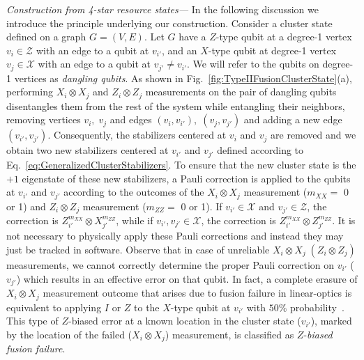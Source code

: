 \documentclass[reprint,
groupedaddress,
 prl,amsmath,amssymb,
 aps]{revtex4-2}
\theoremstyle{definition}
\begin{document}
\begin{bibunit}
{\it Construction from 4-star resource states---} In the following discussion we introduce the principle underlying our construction. Consider a cluster state defined on a graph $G=(V,E)$. Let $G$ have a $Z$-type qubit at a degree-1 vertex $v_i\in\mathcal{Z}$ with an edge to a qubit at $v_{i'}$, and an $X$-type qubit at degree-1 vertex $v_j\in\mathcal{X}$ with an edge to a qubit at $v_{j'}\neq v_{i'}$. We will refer to the qubits on degree-1 vertices as {\it dangling qubits}. As shown in Fig.~\ref{fig:TypeIIFusionClusterState}(a), performing $X_i\otimes X_j$ and $Z_i\otimes Z_j$ measurements on the pair of dangling qubits disentangles them from the rest of the system {while entangling their neighbors}, removing vertices $v_i,\;v_j$ and edges $(v_i,v_{i'}),\; (v_j,v_{j'})$ and adding a new edge $(v_{i'},v_{j'})$. Consequently, the stabilizers centered at $v_i$ and $v_j$ are removed and we obtain two new stabilizers centered at $v_{i'}$ and $v_{j'}$ defined according to Eq.~\eqref{eq:GeneralizedClusterStabilizers}. To ensure that the new cluster state is the $+1$ eigenstate of these new stabilizers, a Pauli correction is applied to the qubits at $v_{i'}$ and $v_{j'}$ according to the outcomes of the $X_i\otimes X_j$ measurement {{($m_{XX}=$ 0 or 1)}} and $Z_i\otimes Z_j$ measurement {{($m_{ZZ}=$ 0 or 1)}}. If $v_{i'}\in\mathcal{X}$ and $v_{j'}\in\mathcal{Z}$, the correction is $Z_{i'}^{m_{XX}}\otimes X_{j'}^{m_{ZZ}}$, while if $v_{i'},v_{j'}\in\mathcal{X}$, the correction is $Z_{i'}^{m_{XX}}\otimes Z_{j'}^{m_{ZZ}}$. It is not necessary to physically apply these Pauli corrections and instead they may just be tracked in software. Observe that in case of unreliable $X_i\otimes X_j\; (Z_i\otimes Z_j)$ measurements, we cannot correctly determine the proper Pauli correction on $v_{i'}$ ($v_{j'}$) which results in an effective error on that qubit. In fact, a complete erasure of $X_i\otimes X_j$ measurement outcome that arises due to fusion failure in linear-optics is equivalent to applying $I$ or $Z$ to the $X$-type qubit at $v_{i'}$ with $50\%$ probability~\cite{supplement}. This type of $Z$-biased error at a known location in the cluster state ($v_{i'}$), marked by the location of the failed ($X_i\otimes X_j$) measurement, is classified as $Z$-{\it biased fusion failure}. 


\end{bibunit}
\end{document}
